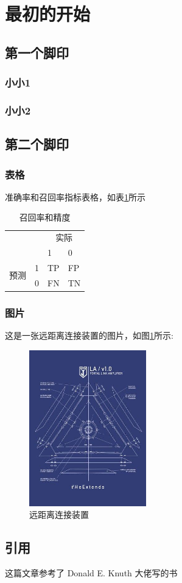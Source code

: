 \setcounter{page}{1} %
\section{最初的开始}
\songti
\subsection{第一个脚印}

\subsubsection{小小1}
\subsubsection{小小2}

\subsection{第二个脚印}

\subsubsection{表格}
准确率和召回率指标表格，如表\ref{f1score}所示
\begin{table}[H]
\centering
\begin{tabular}{|ll|ll|}
\hline
\multicolumn{2}{|l|}{\multirow{2}{*}{}}       & \multicolumn{2}{c|}{实际}      \\ \cline{3-4} 
\multicolumn{2}{|l|}{}                        & \multicolumn{1}{l|}{1}  & 0  \\ \hline
\multicolumn{1}{|r|}{\multirow{2}{*}{预测}} & 1 & \multicolumn{1}{l|}{TP} & FP \\ \cline{2-4} 
\multicolumn{1}{|r|}{}                    & 0 & \multicolumn{1}{l|}{FN} & TN \\ \hline
\end{tabular}
\caption{召回率和精度}
\label{f1score}
\end{table}

\subsubsection{图片}
这是一张远距离连接装置的图片，如图\ref{fig_la}所示:
\begin{figure}[H]
	\centering
	\includegraphics[width=2in]{figures/la.jpg}
	\caption{远距离连接装置}
	\label{fig_la}
\end{figure}

\subsection{引用}

这篇文章参考了 Donald E. Knuth 大佬写的书\cite{1989The}